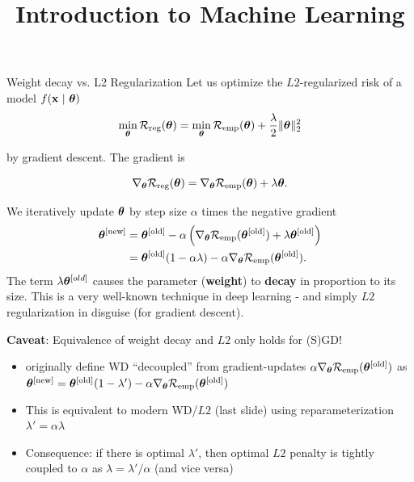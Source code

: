 \documentclass[11pt,compress,t,notes=noshow, xcolor=table]{beamer}
\title{Introduction to Machine Learning}
\begin{document}




\begin{vbframe}{Weight decay vs. L2 Regularization}
Let us optimize the $L2$-regularized risk of a model $f(\mathbf{x} ~|~ \bm{\theta})$
\vspace{-0.2cm}
\[
\min_{\bm{\theta}} \mathcal{R}_{\text{reg}}(\bm{\theta}) = \min_{\bm{\theta}} \mathcal{R}_{\text{emp}}(\bm{\theta}) + \frac{\lambda}{2} \|\bm{\theta}\|^2_2
\]

by gradient descent. The gradient is

\[
\nabla_{\bm{\theta}} \mathcal{R}_{\text{reg}}(\bm{\theta}) = \nabla_{\bm{\theta}} \mathcal{R}_{\text{emp}}(\bm{\theta}) + \lambda \bm{\theta}.
\]

We iteratively update $\bm{\theta}$ by step size \(\alpha\) times the
negative gradient
\vspace{-0.2cm}
\begin{align*}
\bm{\theta}^{[\text{new}]} &= \bm{\theta}^{[\text{old}]} - \alpha \left(\nabla_{\bm{\theta}} \mathcal{R}_{\text{emp}}(\bm{\theta}^{[\text{old}]}) + \lambda \bm{\theta}^{[\text{old}]}\right) \\&=
\bm{\theta}^{[\text{old}]} (1 - \alpha \lambda) - \alpha \nabla_{\bm{\theta}} \mathcal{R}_{\text{emp}}(\bm{\theta}^{[\text{old}]}).
\end{align*}
{\small
The term \(\lambda \bm{\theta}^{[old]}\) causes the parameter
(\textbf{weight}) to \textbf{decay} in proportion to its size. This is a very well-known technique in deep learning - and simply $L2$ regularization in disguise (for gradient descent).
}
\framebreak

\textbf{Caveat}: Equivalence of weight decay and $L2$ only holds for (S)GD!

\vspace{0.1cm}

\begin{itemize}\setlength{\itemsep}{0.5em}
    \item {} originally define WD ``decoupled'' from gradient-updates {\footnotesize $\alpha \nabla_{\bm{\theta}} \mathcal{R}_{\text{emp}}(\bm{\theta}^{[\text{old}]})$} as
    {\footnotesize $\bm{\theta}^{[\text{new}]} =
    \bm{\theta}^{[\text{old}]} (1 - \lambda') - \alpha \nabla_{\bm{\theta}} \mathcal{R}_{\text{emp}}(\bm{\theta}^{[\text{old}]})$}
    \item This is equivalent to modern WD/$L2$ (last slide) using reparameterization $\lambda'=\alpha \lambda$
    \item Consequence: if there is optimal $\lambda'$, then optimal $L2$ penalty is tightly coupled to $\alpha$ as $\lambda=\lambda'/ \alpha$ (and vice versa)
    

\end{itemize}
\end{vbframe}
\end{document}
